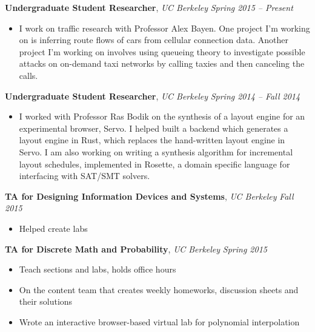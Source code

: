 \documentclass[9pt]{article}
\newenvironment{changemargin}[2]{%
  \begin{list}{}{%
      \setlength{\topsep}{0pt}%
      \setlength{\leftmargin}{#1}%
      \setlength{\rightmargin}{#2}%
      \setlength{\listparindent}{\parindent}%
      \setlength{\itemindent}{\parindent}%
      \setlength{\parsep}{\parskip}%
    }%
  \item[]}{\end{list}
}
\newenvironment{body} {
  \vspace*{-16pt}
  \begin{changemargin}{-0.25in}{-0.5in}
  }
  {\end{changemargin}
}
\begin{document}
\begin{body}
  \vspace{14pt}

  \textbf{Undergraduate Student Researcher}, \emph{UC Berkeley} \hfill \emph{Spring 2015 -- Present}\\
  \vspace*{-4pt}
  \begin{itemize} \itemsep -0pt  %
  \item I work on traffic research with Professor Alex Bayen. One project I'm
    working on is inferring route flows of cars from cellular connection
    data. Another project I'm working on involves using queueing theory to
    investigate possible attacks on on-demand taxi networks by calling taxies
    and then canceling the calls.
  \end{itemize}

  \textbf{Undergraduate Student Researcher}, \emph{UC Berkeley} \hfill \emph{Spring 2014 -- Fall 2014}\\
  \vspace*{-4pt}
  \begin{itemize} \itemsep -0pt  %
  \item I worked with Professor Ras Bodik on the synthesis of a layout engine
    for an experimental browser, Servo. I helped built a backend which generates
    a layout engine in Rust, which replaces the hand-written layout engine in
    Servo. I am also working on writing a synthesis algorithm for incremental
    layout schedules, implemented in Rosette, a domain specific language for
    interfacing with SAT/SMT solvers.
  \end{itemize}

  \textbf{TA for Designing Information Devices and Systems}, \emph{UC Berkeley} \hfill \emph{Fall 2015}\\
  \vspace*{-4pt}
  \begin{itemize} \itemsep -0pt  %
  \item Helped create labs
  \end{itemize}

  \textbf{TA for Discrete Math and Probability}, \emph{UC Berkeley} \hfill \emph{Spring 2015}\\
  \vspace*{-4pt}
  \begin{itemize} \itemsep -0pt  %
  \item Teach sections and labs, holds office hours
  \item On the content team that creates weekly homeworks, discussion sheets and their solutions
  \item Wrote an interactive browser-based virtual lab for polynomial interpolation
  \end{itemize}


\end{body}
\end{document}
